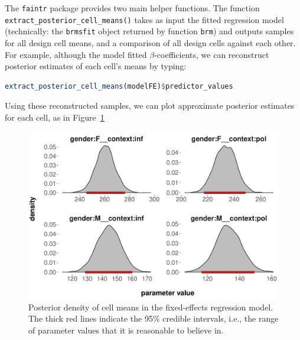 \documentclass[nobib]{tufte-handout}
\begin{document}
The \texttt{faintr} package provides two main helper functions.
%
%
The function \texttt{extract\_posterior\_cell\_means()}
takes as input the fitted regression model (technically: the \texttt{brmsfit} object returned by function \texttt{brm}) and outputs samples for all design cell means, and a comparison of all design cells against each other.
For example, although the model fitted $\beta$-coefficients, we can reconstruct posterior estimates of each cell's means by typing:

\begin{minipage}[]{1.3\textwidth}
\begin{lstlisting}[language=R]
extract_posterior_cell_means(modelFE)$predictor_values
\end{lstlisting}
\end{minipage}

\vspace*{-0.5cm}

\noindent Using these reconstructed samples, we can plot approximate posterior estimates for each cell, as in Figure~\ref{fig:Posteriors_cell_means}

\begin{figure}
  \centering
  \includegraphics[width=\textwidth]{pics/posterior_density_cell_means.pdf}
  \caption[Posteriors over cell means in fixed-effects model]{Posterior density of cell means
    in the fixed-effects regression model. The thick red lines indicate the 95\% credible
    intervals, i.e., the range of parameter values that it is reasonable to believe in.}
  \label{fig:Posteriors_cell_means}
\end{figure}
\end{document}
